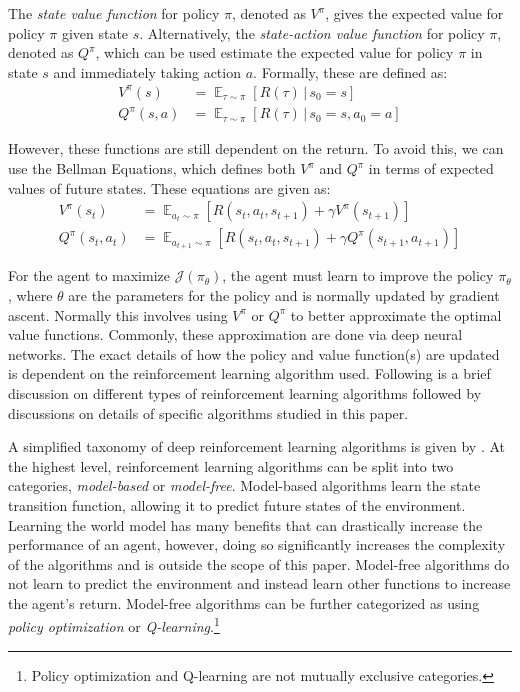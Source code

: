 \documentclass[conference]{IEEEtran}
\begin{document}
The \textit{state value function} for policy $\pi$, denoted as $V^\pi$, gives the expected value for policy $\pi$ given state $s$. Alternatively, the \textit{state-action value function} for policy $\pi$, denoted as $Q^\pi$, which can be used estimate the expected value for policy $\pi$ in state $s$ and immediately taking action $a$. Formally, these are defined as:
\begin{align*}
    V^\pi(s)    & = \mathop{\mathbb{E}}_{\tau \sim \pi}[R(\tau) \, | \, s_0 = s]          \\
    Q^\pi(s, a) & = \mathop{\mathbb{E}}_{\tau \sim \pi}[R(\tau) \, | \, s_0 = s, a_0 = a]
\end{align*}

However, these functions are still dependent on the return. To avoid this, we can use the Bellman Equations, which defines both $V^\pi$ and $Q^\pi$ in terms of expected values of future states. \cite{deep_rl_survey, spinning_up_intro, sutton2018reinforcement} These equations are given as:
\begin{align*}
    V^\pi(s_t)      & = \mathop{\mathbb{E}}_{a_t \sim \pi} [ R(s_t, a_t, s_{t+1}) + \gamma V^\pi(s_{t+1})]              \\
    Q^\pi(s_t, a_t) & = \mathop{\mathbb{E}}_{a_{t+1} \sim \pi} [ R(s_t, a_t, s_{t+1}) + \gamma Q^\pi(s_{t+1}, a_{t+1})]
\end{align*}

For the agent to maximize $\mathcal{J}(\pi_\theta)$, the agent must learn to improve the policy $\pi_\theta$, where $\theta$ are the parameters for the policy and is normally updated by gradient ascent. Normally this involves using $V^\pi$ or $Q^\pi$ to better approximate the optimal value functions. Commonly, these approximation are done via deep neural networks. The exact details of how the policy and value function(s) are updated is dependent on the reinforcement learning algorithm used. Following is a brief discussion on different types of reinforcement learning algorithms followed by discussions on details of specific algorithms studied in this paper.

A simplified taxonomy of deep reinforcement learning algorithms is given by \cite{spinning_up_taxonomy}. At the highest level, reinforcement learning algorithms can be split into two categories, \textit{model-based} or \textit{model-free}. Model-based algorithms learn the state transition function, allowing it to predict future states of the environment. Learning the world model has many benefits that can drastically increase the performance of an agent, however, doing so significantly increases the complexity of the algorithms and is outside the scope of this paper. Model-free algorithms do not learn to predict the environment and instead learn other functions to increase the agent's return. Model-free algorithms can be further categorized as using \textit{policy optimization} or \textit{Q-learning}.\footnote{Policy optimization and Q-learning are not mutually exclusive categories.}
\end{document}
